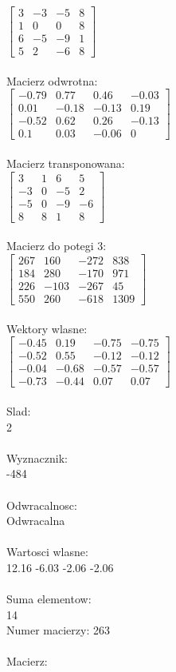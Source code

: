 \documentclass[a4paper,12pt]{article}
\begin{document}
$\begin{bmatrix} 3&-3&-5&8\\1&0&0&8\\6&-5&-9&1\\5&2&-6&8 \end{bmatrix}$
\\
\\
Macierz odwrotna:\\

$\begin{bmatrix} -0.79&0.77&0.46&-0.03\\0.01&-0.18&-0.13&0.19\\-0.52&0.62&0.26&-0.13\\0.1&0.03&-0.06&0 \end{bmatrix}$
\\
\\
Macierz transponowana:\\

$\begin{bmatrix} 3&1&6&5\\-3&0&-5&2\\-5&0&-9&-6\\8&8&1&8 \end{bmatrix}$
\\
\\
Macierz do potegi 3:\\

$\begin{bmatrix} 267&160&-272&838\\184&280&-170&971\\226&-103&-267&45\\550&260&-618&1309 \end{bmatrix}$
\\
\\
Wektory wlasne:\\

$\begin{bmatrix} -0.45&0.19&-0.75&-0.75\\-0.52&0.55&-0.12&-0.12\\-0.04&-0.68&-0.57&-0.57\\-0.73&-0.44&0.07&0.07 \end{bmatrix}$
\\
\\
Slad:\\
2
\\
\\
Wyznacznik:\\
-484
\\
\\
Odwracalnosc:\\
Odwracalna
\\
\\
Wartosci wlasne:\\
12.16 -6.03 -2.06 -2.06
\\
\\
Suma elementow:\\
14
\\
\newpage
Numer macierzy:
263
\\
\\
Macierz:\\
\end{document}
